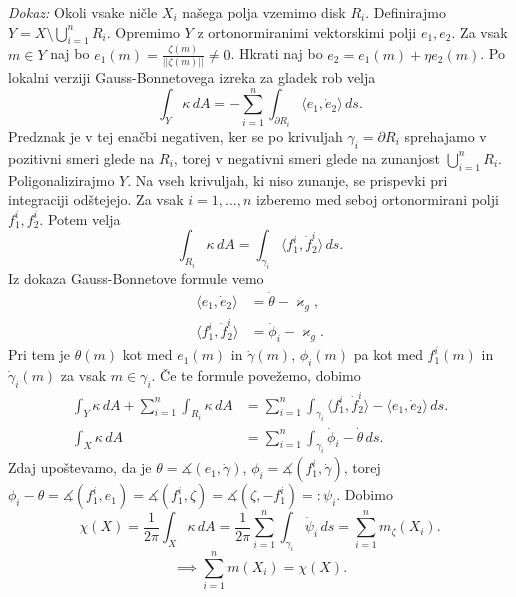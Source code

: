 \noindent
{\em Dokaz:\/}
Okoli vsake ničle $X_i$ našega polja vzemimo disk $R_i$. Definirajmo $Y = X \setminus \bigcup_{i = 1}^{n} R_i$. Opremimo $Y$ z ortonormiranimi vektorskimi polji $e_1, e_2$. Za vsak $m \in Y$ naj bo $e_1(m) = \frac{\zeta(m)}{\lvert\lvert \zeta(m) \rvert\rvert } \neq 0$. Hkrati naj bo
$e_2 = e_1(m) + \eta e_2(m)$. Po lokalni verziji Gauss-Bonnetovega izreka za gladek rob velja \begin{equation*}
\int_{Y} \kappa  \, dA = -\sum_{i = 1}^{n} \int_{\partial R_i} \langle e_1, \dot{e}_2 \rangle   \, ds.  
\end{equation*}
Predznak je v tej enačbi negativen, ker se po krivuljah $\gamma_i = \partial R_i$ sprehajamo v pozitivni smeri glede na $R_i$, torej v negativni smeri glede na zunanjost $\bigcup_{i = 1}^{n} R_i$.    
Poligonalizirajmo $Y$. Na vseh krivuljah, ki niso zunanje, se prispevki pri integraciji odštejejo. Za vsak $i = 1 ,\ldots, n$ izberemo med seboj ortonormirani polji $f_1^{i}, f_2^{i}$. Potem velja \begin{equation*}
\int_{R_i} \kappa   \, dA = \int_{\gamma_i} \langle f_1^{i}, \dot{f}_2^{i} \rangle   \, ds.  
\end{equation*}  
Iz dokaza Gauss-Bonnetove formule vemo \begin{align*}
    \langle e_1, \dot{e}_2  \rangle  &= \dot{\theta} - \varkappa_g, \\
    \langle f_1^{i}, \dot{f}_2^{i}  \rangle  &= \dot{\phi}_i - \varkappa_g. 
\end{align*}
Pri tem je $\theta(m)$ kot med $e_1(m)$ in $\dot{\gamma}(m)$, $\phi_i(m)$ pa kot med $f_1^{i}(m)$ in $\dot{\gamma}_i(m)$ za vsak $m \in  \gamma_i$. Če te formule povežemo, dobimo \begin{align*}
    \int_{Y} \kappa  \, dA  + \sum_{i = 1}^{n} \int_{R_i} \kappa \, dA  &= \sum_{i = 1}^{n}  \int_{\gamma_i} \langle f_1^{i}, \dot{f}_2^{i} \rangle -  \langle e_1, \dot{e}_2 \rangle    \, ds.    \\
    \int_{X} \kappa  \, dA  &= \sum_{i = 1}^{n} \int_{\gamma_i}  \dot{\phi}_i  - \dot{\theta} \, ds.  
\end{align*}
Zdaj upoštevamo, da je $\theta = \measuredangle{(e_1, \dot{\gamma})}$, $\phi_i = \measuredangle{(f_1^{i}, \dot{\gamma})}$, torej $\phi_i - \theta = \measuredangle{(f_1^{i}, e_1)} = \measuredangle{(f_1^{i}, \zeta)} = \measuredangle{(\zeta, -f_1^i)} =: \psi_i$.
Dobimo \begin{equation*}
  \chi(X) =  \frac{1}{2\pi} \int_{X} \kappa  \, dA = \frac{1}{2\pi}\sum_{i = 1}^{n} \int_{\gamma_i} \dot{\psi}_i  \, ds =  \sum_{i = 1}^{n} m_\zeta(X_i). 
\end{equation*}
\begin{equation*}
\implies \sum_{i = 1}^{n} m(X_i) = \chi(X).
\end{equation*}  
    
